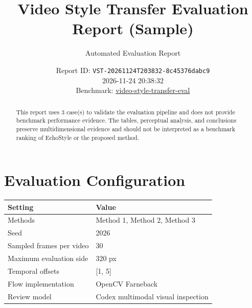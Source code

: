 \documentclass[10pt]{article}
\begin{document}
\title{Video Style Transfer Evaluation Report (Sample)}
\author{Automated Evaluation Report}
\date{Report ID: \texttt{VST-20261124T203832-8c45376dabc9} \\ 2026-11-24 20:38:32 \\ Benchmark: \href{https://github.com/0x0addc001/video-style-transfer-eval}{video-style-transfer-eval}}
\maketitle
\begin{abstract}
This report uses 3 case(s) to validate the evaluation pipeline and does not provide benchmark performance evidence. The tables, perceptual analysis, and conclusions preserve multidimensional evidence and should not be interpreted as a benchmark ranking of EchoStyle or the proposed method.
\end{abstract}
\section*{Evaluation Configuration}
\begin{tabular}{@{}ll@{}}
\toprule
Setting & Value \\
\midrule
Methods & Method 1, Method 2, Method 3 \\
Seed & 2026 \\
Sampled frames per video & 30 \\
Maximum evaluation side & 320 px \\
Temporal offsets & [1, 5] \\
Flow implementation & OpenCV Farneback \\
Review model & Codex multimodal visual inspection \\
\bottomrule
\end{tabular}
\end{document}

